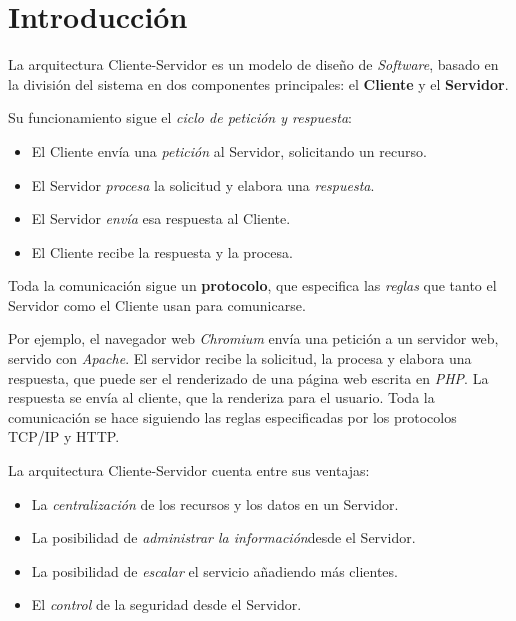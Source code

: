 \documentclass[11pt]{article}
\begin{document}

\newpage

\tableofcontents
\newpage

\section{Introducción}

La arquitectura Cliente-Servidor es un modelo de diseño de \emph{Software},
basado en la división del sistema en dos componentes principales:
el \textbf{Cliente} y el \textbf{Servidor}.

Su funcionamiento sigue el \emph{ciclo de petición y respuesta}:
\begin{itemize}
    \item El Cliente envía una \emph{petición} al Servidor,
    solicitando un recurso.

    \item El Servidor \emph{procesa} la solicitud y elabora una
    \emph{respuesta}.
    
    \item El Servidor \emph{envía} esa respuesta al Cliente.

    \item El Cliente recibe la respuesta y la procesa.
\end{itemize}

Toda la comunicación sigue un \textbf{protocolo},
que especifica las \emph{reglas} que tanto el Servidor como el Cliente usan para
comunicarse.

Por ejemplo, el navegador web \emph{Chromium} envía una petición a un servidor
web, servido con \emph{Apache}.
El servidor recibe la solicitud, la procesa y elabora una respuesta, que puede
ser el renderizado de una página web escrita en \emph{PHP}.
La respuesta se envía al cliente, que la renderiza para el usuario.
Toda la comunicación se hace siguiendo las reglas especificadas por los
protocolos TCP/IP y HTTP.

La arquitectura Cliente-Servidor cuenta entre sus ventajas:
\begin{itemize}
    \item La \emph{centralización} de los recursos y los datos en un Servidor.
    
    \item La posibilidad de \emph{administrar la información}desde el Servidor.
    
    \item La posibilidad de \emph{escalar} el servicio añadiendo más clientes.
    
    \item El \emph{control} de la seguridad desde el Servidor.
\end{itemize}
\end{document}
